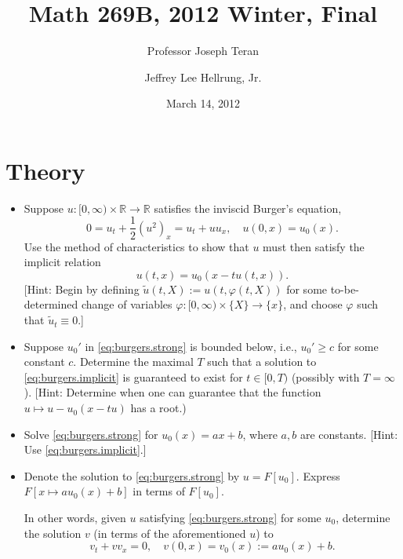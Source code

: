 \documentclass{article}
\begin{document}
\title{Math 269B, 2012 Winter, Final}
\date{March 14, 2012}
\author{Professor Joseph Teran \and Jeffrey Lee Hellrung, Jr.}
\maketitle

\section{Theory}

\begin{itemize}

\item[1.] Suppose $u \colon [0,\infty) \times \mathbb{R} \to \mathbb{R}$ satisfies the inviscid Burger's equation,
\begin{equation}\label{eq:burgers.strong}
0 = u_t + \frac{1}{2} \left( u^2 \right)_x = u_t + u u_x, \quad u(0,x) = u_0(x).
\end{equation}
Use the method of characteristics to show that $u$ must then satisfy the implicit relation
\begin{equation}\label{eq:burgers.implicit}
u(t,x) = u_0 \left( x - t u(t,x) \right).
\end{equation}
[Hint: Begin by defining $\tilde{u}(t,X) := u \left( t, \varphi(t,X) \right)$ for some to-be-determined change of variables $\varphi \colon [0,\infty) \times \{X\} \to \{x\}$, and choose $\varphi$ such that $\tilde{u}_t \equiv 0$.]

\item[2.] Suppose $u_0'$ in \eqref{eq:burgers.strong} is bounded below, i.e., $u_0' \geq c$ for some constant $c$. Determine the maximal $T$ such that a solution to \eqref{eq:burgers.implicit} is guaranteed to exist for $t \in [0,T)$ (possibly with $T = \infty$). [Hint: Determine when one can guarantee that the function $u \mapsto u - u_0(x - tu)$ has a root.)

\item[3.] Solve \eqref{eq:burgers.strong} for $u_0(x) = ax + b$, where $a,b$ are constants. [Hint: Use \eqref{eq:burgers.implicit}.]

\item[4.] Denote the solution to \eqref{eq:burgers.strong} by $u = F \left[ u_0 \right]$. Express $F \left[ x \mapsto a u_0(x) + b \right]$ in terms of $F \left[ u_0 \right]$.

In other words, given $u$ satisfying \eqref{eq:burgers.strong} for some $u_0$, determine the solution $v$ (in terms of the aforementioned $u$) to
\begin{equation*}
v_t + v v_x = 0, \quad v(0,x) = v_0(x) := a u_0(x) + b.
\end{equation*}


\end{itemize}
\end{document}
